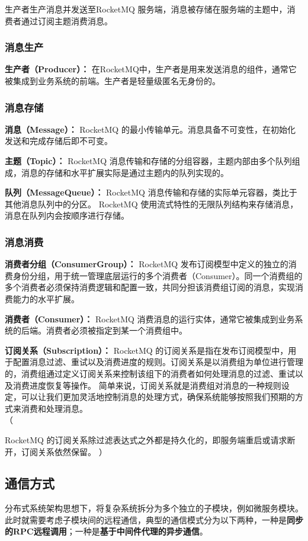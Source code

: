 \documentclass[11pt, a4paper, oneside, fontset=none]{ctexbook}
\newenvironment{ignore}{%
  \color{gray}%
  \ignorespaces%
  （%
}{%
  ）%
  \ignorespacesafterend%
}
\begin{document}
生产者生产消息并发送至RocketMQ 服务端，消息被存储在服务端的主题中，消费者通过订阅主题消费消息。

\subsubsection{消息生产}
\textbf{生产者（Producer）：}
在RocketMQ中，生产者是用来发送消息的组件，通常它被集成到业务系统的前端。生产者是轻量级匿名无身份的。

\subsubsection{消息存储}
\textbf{消息（Message）：}
RocketMQ 的最小传输单元。消息具备不可变性，在初始化发送和完成存储后即不可变。

\textbf{主题（Topic）：}
RocketMQ 消息传输和存储的分组容器，主题内部由多个队列组成，消息的存储和水平扩展实际是通过主题内的队列实现的。

\textbf{队列（MessageQueue）：}
RocketMQ 消息传输和存储的实际单元容器，类比于其他消息队列中的分区。 RocketMQ 使用流式特性的无限队列结构来存储消息，消息在队列内会按顺序进行存储。

\subsubsection{消息消费}
\textbf{消费者分组（ConsumerGroup）：}
RocketMQ 发布订阅模型中定义的独立的消费身份分组，用于统一管理底层运行的多个消费者（Consumer）。同一个消费组的多个消费者必须保持消费逻辑和配置一致，共同分担该消费组订阅的消息，实现消费能力的水平扩展。

\textbf{消费者（Consumer）：}
RocketMQ 消费消息的运行实体，通常它被集成到业务系统的后端。消费者必须被指定到某一个消费组中。

\textbf{订阅关系（Subscription）：}
RocketMQ 的订阅关系是指在发布订阅模型中，用于配置消息过滤、重试以及消费进度的规则。订阅关系是以消费组为单位进行管理的，消费组通过定义订阅关系来控制该组下的消费者如何处理消息的过滤、重试以及消费进度恢复等操作。
简单来说，订阅关系就是消费组对消息的一种规则设定，可以让我们更加灵活地控制消息的处理方式，确保系统能够按照我们预期的方式来消费和处理消息。\\
\begin{ignore}
  RocketMQ 的订阅关系除过滤表达式之外都是持久化的，即服务端重启或请求断开，订阅关系依然保留。
\end{ignore}

\subsection{通信方式}
分布式系统架构思想下，将复杂系统拆分为多个独立的子模块，例如微服务模块。此时就需要考虑子模块间的远程通信，典型的通信模式分为以下两种，一种是{\bfseries\kaishu 同步的RPC远程调用}；一种是{\bfseries\kaishu 基于中间件代理的异步通信}。
\end{document}
